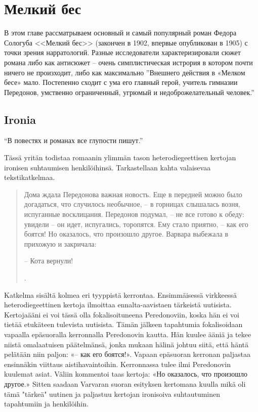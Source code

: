 \documentclass[12pt,a4paper]{article}
\begin{document}
\section{Мелкий бес}

В этом главе рассматрываем основный и самый популярный роман Федора Сологуба <<Мелкий бес>> (закончен в 1902, впервые опубликован в 1905) с точки зрения нарратологий. Разные исследователи характеризировали сюжет романа либо как антисюжет -- очень симплистическая истрория в котором почти ничего не произходит, либо как максимально  
''Внешнего действия в «Мелком бесе» мало. Постепенно сходит с ума его главный герой, учитель гимназии Передонов, умственно ограниченный, угрюмый и недоброжелательный человек.''
\autocite[432.]{grigorjev1983}


\subsection{Ironia}

\enquote{В повестях и романах все глупости пишут.}\parencite[54]{sologub2004}

Tässä yritän todistaa romaanin ylimmän tason heterodiegeettisen kertojan ironisen suhtaumisen henkilöihinsä.
Tarkastellaan kahta valaisevaa tekstikatkelmaa.

\begin{quote}
Дома ждала Передонова важная новость. Еще в передней можно
было догадаться, что случилось необычное, – в горницах слышалась 
возня, испуганные восклицания. Передонов подумал, – не все
готово к обеду: увидели – он идет, испугались, торопятся. Ему стало
приятно, – как его боятся! Но оказалось, что произошло другое. 
Варвара выбежала в прихожую и закричала:

– Кота вернули!

\parencite[171]{sologub2004}.

\end{quote}

Katkelma sisältä kolmea eri tyyppistä kerrontaa. Ensimmäisessä virkkeessä
heterodiegeettinen kertoja ilmoittaa ennalta-aavistaen tärkeistä uutisista.
Kertojaääni ei voi tässä olla fokalisoituneena Peredonoviin, koska
hän ei voi tietää etukäteen tulevista uutisista. Tämän jälkeen tapahtumia
fokalisoidaan vapaalla epäsuoralla kerronnalla Peredonovin kautta.
Hän kuulee ääniä ja tekee niistä omalaatuisen päätelmänsä, jonka mukaan hälinä
johtuu siitä, että häntä pelätään niin paljon: «– как его боятся!».
Vapaan epäsuoran kerronan paljastaa ensinnäkin viittaus aistihavaintoihin. Kerronnassa tulee ilmi Peredonovin kuulemat asiat. Väliin kommentoi taas kertoja: «Но оказалось, что произошло другое.» Sitten saadaan
Varvaran suoran esityksen kertomana kuulla mikä oli tämä "tärkeä" uutinen ja
paljastuu kertojan ironisoiva suhtautuminen tapahtumiin ja henkilöihin.
\end{document}
